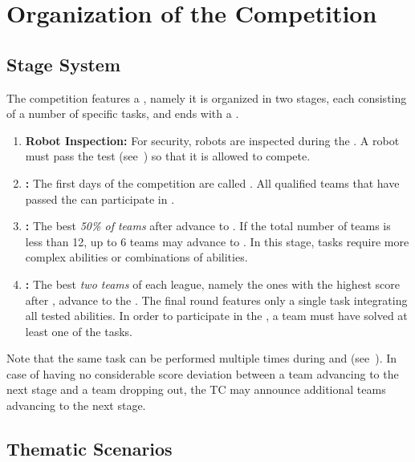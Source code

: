 \section{Organization of the Competition}
\label{sec:procedure_during_competition}

\subsection{Stage System}\label{rule:stages}

The competition features a , namely it is organized in two stages, each consisting of a number of specific tasks, and ends with a \FINAL.
\begin{enumerate}
	\item \textbf{Robot Inspection:} For security, robots are inspected during the \SetupDays.
	A robot must pass the \RobotInspection{} test (see~) so that it is allowed to compete.

	\item \textbf{\SONE:} The first days of the competition are called \SONE.
	All qualified teams that have passed the \RobotInspection{} can participate in \SONE.


	\item \textbf{\STWO:} The best \emph{50\% of teams} after \SONE{} advance to \STWO. If the total number of teams is less than 12, up to 6 teams may advance to \STWO.
	In this stage, tasks require more complex abilities or combinations of abilities.

	\item \textbf{\FINAL:} The best \emph{two teams} of each league, namely the ones with the highest score after \STWO, advance to the \FINAL.
	The final round features only a single task integrating all tested abilities.
	In order to participate in the \FINAL, a team must have solved at least one of the \STWO{} tasks.
\end{enumerate}
Note that the same task can be performed multiple times during \SONE{} and \STWO{} (see~).
In case of having no considerable score deviation between a team advancing to the next stage and a team dropping out, the TC may announce additional teams advancing to the next stage.

\subsection{Thematic Scenarios}
\label{rule:themes}

